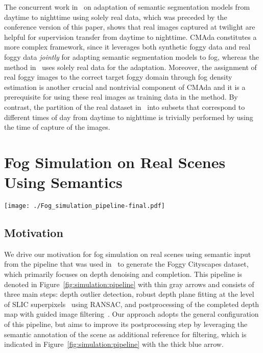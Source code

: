 \documentclass[twocolumn]{svjour3}          \smartqed  \usepackage{graphicx}
\begin{document}
The concurrent work in~\cite{daytime:2:nighttime} on adaptation of semantic segmentation models from daytime to nighttime using solely real data, which was preceded by the conference version of this paper, shows that real images captured at twilight are helpful for supervision transfer from daytime to nighttime. CMAda constitutes a more complex framework, since it leverages both synthetic foggy data and real foggy data \emph{jointly} for adapting semantic segmentation models to fog, whereas the method in~\cite{daytime:2:nighttime} uses solely real data for the adaptation. Moreover, the assignment of real foggy images to the correct target foggy domain through fog density estimation is another crucial and nontrivial component of CMAda and it is a prerequisite for using these real images as training data in the method. By contrast, the partition of the real dataset in~\cite{daytime:2:nighttime} into subsets that correspond to different times of day from daytime to nighttime is trivially performed by using the time of capture of the images.



\section{Fog Simulation on Real Scenes Using Semantics}
\label{sec:simulation}

\begin{figure*}[tb]
  \centering
  \texttt{[image: ./Fog\_simulation\_pipeline-final.pdf]}
  \caption{The pipeline of our fog simulation using semantics}
  \label{fig:simulation:pipeline}
\end{figure*}

\subsection{Motivation}

We drive our motivation for fog simulation on real scenes using semantic input from the pipeline that was used in~\cite{SFSU_synthetic} to generate the Foggy Cityscapes dataset, which primarily focuses on depth denoising and completion. This pipeline is denoted in Figure~\ref{fig:simulation:pipeline} with thin gray arrows and consists of three main steps: depth outlier detection, robust depth plane fitting at the level of SLIC superpixels~\cite{slic:superpixels} using RANSAC, and postprocessing of the completed depth map with guided image filtering~\cite{guided:filtering}. Our approach adopts the general configuration of this pipeline, but aims to improve its postprocessing step by leveraging the semantic annotation of the scene as additional reference for filtering, which is indicated in Figure~\ref{fig:simulation:pipeline} with the thick blue arrow.
\end{document}

